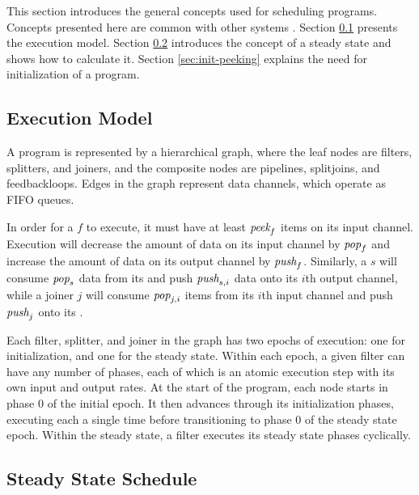 \documentclass{sig-alt-full}
\begin{document}
This section introduces the general concepts used for scheduling
{\StreamIt} programs.  Concepts presented here are common with other
systems \cite{ptolemyoverview}.  Section \ref{sec:exec-model} presents
the {\StreamIt} execution model. Section \ref{sec:steady-state}
introduces the concept of a steady state and shows how to calculate
it. Section \ref{sec:init-peeking} explains the need for
initialization of a {\StreamIt} program.

\subsection{{\StreamIt} Execution Model}
\label{sec:exec-model}

A {\StreamIt} program is represented by a hierarchical graph, where
the leaf nodes are filters, splitters, and joiners, and the composite
nodes are pipelines, splitjoins, and feedbackloops.  Edges in the
graph represent data channels, which operate as FIFO queues.

In order for a {\filter} $f$ to execute, it must have at least
$\mbox{\it peek}_f$ items on its input channel.  Execution will decrease the
amount of data on its input channel by $\mbox{\it pop}_f$ and increase the
amount of data on its output channel by $\mbox{\it push}_f$. Similarly, a
{\splitter} $s$ will consume $\mbox{\it pop}_s$ data from its {\Input}
{\Channel} and push $\mbox{\it push}_{s,i}$ data onto its $i$th output
channel, while a joiner $j$ will consume $\mbox{\it pop}_{j,i}$ items from
its $i$th input channel and push $\mbox{\it push}_j$ onto its {\Output}
{\Channel}.

Each filter, splitter, and joiner in the graph has two epochs of
execution: one for initialization, and one for the steady state.
Within each epoch, a given filter can have any number of phases, each
of which is an atomic execution step with its own input and output
rates.  At the start of the program, each node starts in phase $0$ of
the initial epoch.  It then advances through its initialization
phases, executing each a single time before transitioning to phase $0$
of the steady state epoch.  Within the steady state, a filter executes
its steady state phases cyclically.

\subsection{Steady State Schedule}
\label{sec:steady-state}
\end{document}
